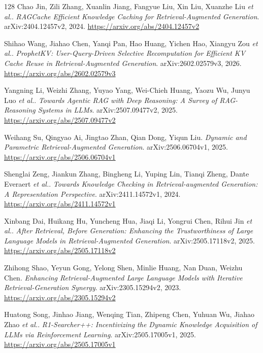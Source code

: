 \documentclass[11pt,a4paper]{article}
\begin{document}
\begin{thebibliography}{128}
Chao Jin, Zili Zhang, Xuanlin Jiang, Fangyue Liu, Xin Liu, Xuanzhe Liu \emph{et al.}.
\newblock \emph{RAGCache Efficient Knowledge Caching for Retrieval-Augmented Generation}.
\newblock arXiv:2404.12457v2, 2024.
\newblock \url{https://arxiv.org/abs/2404.12457v2}

Shihao Wang, Jiahao Chen, Yanqi Pan, Hao Huang, Yichen Hao, Xiangyu Zou \emph{et al.}.
\newblock \emph{ProphetKV: User-Query-Driven Selective Recomputation for Efficient KV Cache Reuse in Retrieval-Augmented Generation}.
\newblock arXiv:2602.02579v3, 2026.
\newblock \url{https://arxiv.org/abs/2602.02579v3}

Yangning Li, Weizhi Zhang, Yuyao Yang, Wei-Chieh Huang, Yaozu Wu, Junyu Luo \emph{et al.}.
\newblock \emph{Towards Agentic RAG with Deep Reasoning: A Survey of RAG-Reasoning Systems in LLMs}.
\newblock arXiv:2507.09477v2, 2025.
\newblock \url{https://arxiv.org/abs/2507.09477v2}

Weihang Su, Qingyao Ai, Jingtao Zhan, Qian Dong, Yiqun Liu.
\newblock \emph{Dynamic and Parametric Retrieval-Augmented Generation}.
\newblock arXiv:2506.06704v1, 2025.
\newblock \url{https://arxiv.org/abs/2506.06704v1}

Shenglai Zeng, Jiankun Zhang, Bingheng Li, Yuping Lin, Tianqi Zheng, Dante Everaert \emph{et al.}.
\newblock \emph{Towards Knowledge Checking in Retrieval-augmented Generation: A Representation Perspective}.
\newblock arXiv:2411.14572v1, 2024.
\newblock \url{https://arxiv.org/abs/2411.14572v1}

Xinbang Dai, Huikang Hu, Yuncheng Hua, Jiaqi Li, Yongrui Chen, Rihui Jin \emph{et al.}.
\newblock \emph{After Retrieval, Before Generation: Enhancing the Trustworthiness of Large Language Models in Retrieval-Augmented Generation}.
\newblock arXiv:2505.17118v2, 2025.
\newblock \url{https://arxiv.org/abs/2505.17118v2}

Zhihong Shao, Yeyun Gong, Yelong Shen, Minlie Huang, Nan Duan, Weizhu Chen.
\newblock \emph{Enhancing Retrieval-Augmented Large Language Models with Iterative Retrieval-Generation Synergy}.
\newblock arXiv:2305.15294v2, 2023.
\newblock \url{https://arxiv.org/abs/2305.15294v2}

Huatong Song, Jinhao Jiang, Wenqing Tian, Zhipeng Chen, Yuhuan Wu, Jiahao Zhao \emph{et al.}.
\newblock \emph{R1-Searcher++: Incentivizing the Dynamic Knowledge Acquisition of LLMs via Reinforcement Learning}.
\newblock arXiv:2505.17005v1, 2025.
\newblock \url{https://arxiv.org/abs/2505.17005v1}


\end{thebibliography}
\end{document}
